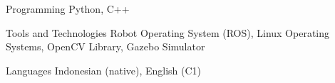 

\begin{cvskills}

  \cvskill
    {Programming} %
    {Python, C++} %

  \cvskill
    {Tools and Technologies} %
    {Robot Operating System (ROS), Linux Operating Systems, OpenCV Library, Gazebo Simulator} %

  \cvskill
    {Languages} %
    {Indonesian (native), English (C1)} %

\end{cvskills}
